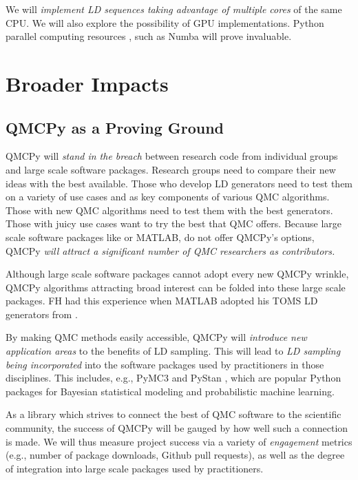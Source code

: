 \documentclass[11pt]{NSFamsart}
\begin{document}
We will \emph{implement LD sequences taking advantage of multiple cores} of the same CPU.  We will also explore the possibility of GPU implementations.  Python parallel computing resources \cite{ParallelPython}, such as Numba \cite{Numba} will prove invaluable.



\section{Broader Impacts}
\subsection{QMCPy as a Proving Ground}
QMCPy will \emph{stand in the breach} between research code from individual groups and large scale software packages.  Research groups need to compare their new ideas with the best available.  Those who develop LD generators need to test them on a variety of use cases and as key components of various QMC algorithms.  Those with new QMC algorithms need to test them with the best generators.  Those with juicy use cases want to try the best that QMC offers.  Because large scale software packages like  or MATLAB, do not offer QMCPy's options,  QMCPy \emph{will attract a significant number of QMC researchers as contributors.}

Although large scale software packages cannot adopt every new QMCPy wrinkle, QMCPy algorithms attracting broad interest can be folded into these large scale packages. FH had this experience when MATLAB adopted his TOMS LD generators from \cite{HonHic00a}.

By making QMC methods easily accessible, QMCPy will \emph{introduce new application areas} to the benefits of LD sampling.  This will lead to \emph{LD sampling being incorporated} into the software packages used by practitioners in those disciplines. This includes, e.g., PyMC3 \citep{salvatier2016probabilistic} and PyStan \citep{stan2017pystan}, which are popular Python packages for Bayesian statistical modeling and probabilistic machine learning.

As a library which strives to connect the best of QMC software to the scientific community, the success of QMCPy will be gauged by how well such a connection is made. We will thus measure project success via a variety of \textit{engagement} metrics (e.g., number of package downloads, Github pull requests), as well as the degree of integration into large scale packages used by practitioners.
\end{document}
